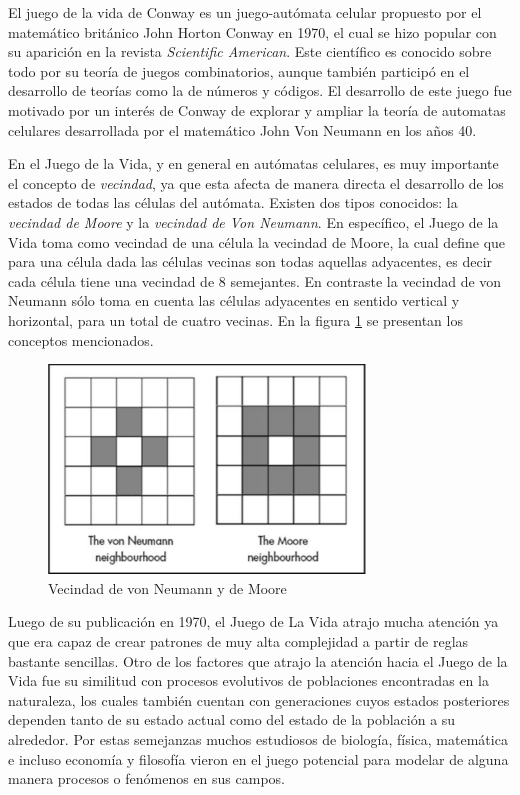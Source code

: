 \documentclass[12pt,letterpaper]{article}
\begin{document}
El juego de la vida de Conway es un juego-autómata celular propuesto por el matemático británico John Horton Conway en 1970, el cual se hizo popular con su aparición en la revista \textit{Scientific American}. 
Este científico es conocido sobre todo por su teoría de juegos combinatorios, aunque también participó en el desarrollo de teorías como la de números y códigos.\cite{CarlosIII}
El desarrollo de este juego fue motivado por un interés de Conway de explorar y ampliar la teoría de automatas celulares desarrollada por el matemático John Von Neumann en los años 40. 

En el Juego de la Vida, y en general en autómatas celulares, es muy importante el concepto de \textit{vecindad}, ya que esta afecta de manera directa el desarrollo de los estados de todas las células del autómata. Existen dos tipos conocidos: la \textit{vecindad de Moore} y la \textit{vecindad de Von Neumann}. En específico, el Juego de la Vida toma como vecindad de una célula la vecindad de Moore, la cual define que para una célula dada las células vecinas son todas aquellas adyacentes, es decir cada célula tiene una vecindad de 8 semejantes. En contraste la vecindad de von Neumann sólo toma en cuenta las células adyacentes en sentido vertical y horizontal, para un total de cuatro vecinas. En la figura \ref{fig:vecindad} se presentan los conceptos mencionados. 

\begin{figure}[H]
\centering
\includegraphics[width=0.75\textwidth]{img/vecindades.png}
\caption{\label{fig:vecindad}Vecindad de von Neumann y de Moore \cite{vec}}
\end{figure}

Luego de su publicación en 1970, el Juego de La Vida atrajo mucha atención ya que era capaz de crear patrones de muy alta complejidad a partir de reglas bastante sencillas.
Otro de los factores que atrajo la atención hacia el Juego de la Vida fue su similitud con procesos evolutivos de poblaciones encontradas en la naturaleza, los cuales también cuentan con generaciones cuyos estados posteriores dependen tanto de su estado actual como del estado de la población a su alrededor. Por estas semejanzas muchos estudiosos de biología, física, matemática e incluso economía y filosofía vieron en el juego potencial para modelar de alguna manera procesos o fenómenos en sus campos.
\end{document}

